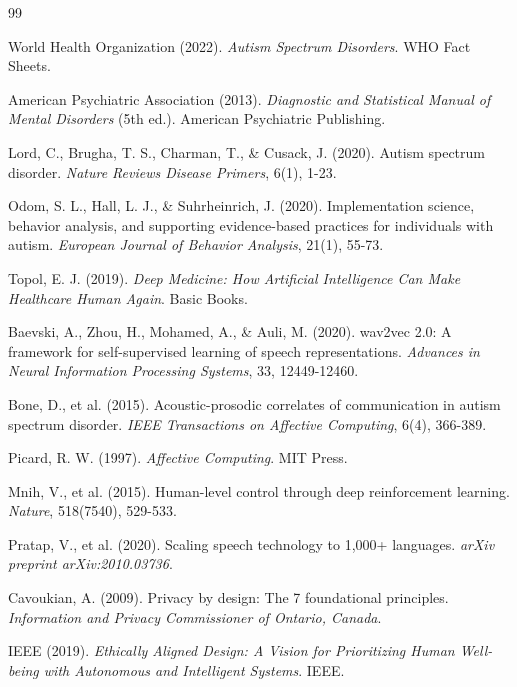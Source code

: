\documentclass[12pt,a4paper]{article}
\begin{document}
\begin{thebibliography}{99}

World Health Organization (2022). \textit{Autism Spectrum Disorders}. WHO Fact Sheets.

American Psychiatric Association (2013). \textit{Diagnostic and Statistical Manual of Mental Disorders} (5th ed.). American Psychiatric Publishing.

Lord, C., Brugha, T. S., Charman, T., \& Cusack, J. (2020). Autism spectrum disorder. \textit{Nature Reviews Disease Primers}, 6(1), 1-23.

Odom, S. L., Hall, L. J., \& Suhrheinrich, J. (2020). Implementation science, behavior analysis, and supporting evidence-based practices for individuals with autism. \textit{European Journal of Behavior Analysis}, 21(1), 55-73.

Topol, E. J. (2019). \textit{Deep Medicine: How Artificial Intelligence Can Make Healthcare Human Again}. Basic Books.

Baevski, A., Zhou, H., Mohamed, A., \& Auli, M. (2020). wav2vec 2.0: A framework for self-supervised learning of speech representations. \textit{Advances in Neural Information Processing Systems}, 33, 12449-12460.

Bone, D., et al. (2015). Acoustic-prosodic correlates of communication in autism spectrum disorder. \textit{IEEE Transactions on Affective Computing}, 6(4), 366-389.

Picard, R. W. (1997). \textit{Affective Computing}. MIT Press.

Mnih, V., et al. (2015). Human-level control through deep reinforcement learning. \textit{Nature}, 518(7540), 529-533.

Pratap, V., et al. (2020). Scaling speech technology to 1,000+ languages. \textit{arXiv preprint arXiv:2010.03736}.

Cavoukian, A. (2009). Privacy by design: The 7 foundational principles. \textit{Information and Privacy Commissioner of Ontario, Canada}.

IEEE (2019). \textit{Ethically Aligned Design: A Vision for Prioritizing Human Well-being with Autonomous and Intelligent Systems}. IEEE.

\end{thebibliography}
\end{document}

